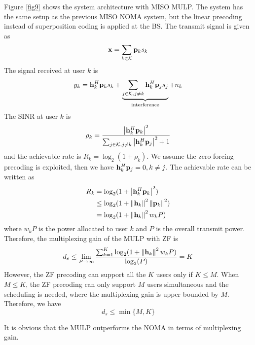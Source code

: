 \documentclass[10pt,conference]{IEEEtran}
\begin{document}
Figure \ref{fig9} shows the system architecture with MISO MULP. The system has the same 
setup as the previous MISO NOMA system, but the linear precoding  instead of superposition coding
is applied at the BS. The transmit signal is given as 
\begin{equation}
    {\bf{x}} = \sum_{k \in \mathcal{K}} {\bf{p}}_k s_k \label{49}
\end{equation}
The signal received at user $k$ is
\begin{equation}
    y_k = {\bf{h}}_k^H {\bf{p}}_k s_k + \underbrace{\sum_{j \in \mathcal{K}, j \neq k} {\bf{h}}_k^H {\bf{p}}_j s_j}_{\text{interference}} + n_k \label{51}
\end{equation}
The SINR at user $k$ is
\begin{equation}
    \rho_k = \frac{\left| {\bf{h}}_k^H {\bf{p}}_k \right|^2}{\sum_{j \in \mathcal{K}, j \neq k} \left| {\bf{h}}_k^H {\bf{p}}_j \right|^2 + 1}
\end{equation}
and the achievable rate is $R_k = \log_2(1+\rho_k)$. We assume the zero forcing precoding is exploited,
then we have ${\bf{h}}_k^H {\bf{p}}_j = 0, k \neq j$. The achievable rate can be written as
\begin{align}
    R_k &= \log_2 (1 + \left| {\bf{h}}_k^H {\bf{p}}_k \right|^2) \nonumber \\
    &\leq \log_2 (1 + \left\Vert {\bf{h}}_k \right\Vert^2 \left\Vert{\bf{p}}_k \right\Vert^2) \nonumber\\
    & = \log_2 (1 + \left\Vert {\bf{h}}_k \right\Vert^2 w_k P) \label{eq51}
\end{align} 
where $w_k P$ is the power allocated to user $k$ and $P$ is the overall transmit power. Therefore,
the multiplexing gain of the MULP with ZF is 
\begin{equation}
    d_s \leq \lim_{P \to \infty} \frac{\sum_{k=1}^K \log_2 (1 + \left\Vert {\bf{h}}_k \right\Vert^2 w_k P)}{\log_2(P)} = K \label{53}
\end{equation}
However, the ZF precoding can support all the $K$ users only if $K \leq M$. When $M \leq K$,
the ZF precoding can only support $M$ users simultaneous and the scheduling is needed, where the multiplexing gain
is upper bounded by $M$. Therefore, we have
\begin{equation}
    d_s \leq \min\{M,K\} \label{eq54}
\end{equation}

It is obvious that the MULP outperforms the NOMA in terms of multiplexing gain.
\end{document}
